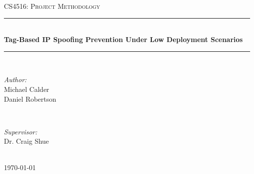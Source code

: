 \documentclass[12pt]{article} %
\begin{document}

\begin{titlepage}

\newcommand{\HRule}{\rule{\linewidth}{0.5mm}} %

\center %

\textsc{\LARGE CS4516: Project Methodology}\\[1.5cm] %

\HRule \\[0.4cm]
{ \huge \bfseries Tag-Based IP Spoofing Prevention Under Low Deployment Scenarios}\\[0.4cm] %
\HRule \\[1.5cm]

\begin{minipage}{0.4\textwidth}
\begin{flushleft} \large
\emph{Author:}\\
Michael Calder\\
Daniel Robertson\\
\end{flushleft}
\end{minipage}
~
\begin{minipage}{0.4\textwidth}
\begin{flushright} \large
\emph{Supervisor:} \\
Dr. Craig Shue %
\end{flushright}
\end{minipage}\\[4cm]

{\large \today}\\[3cm] %


\vfill %

\end{titlepage}

\end{document}
